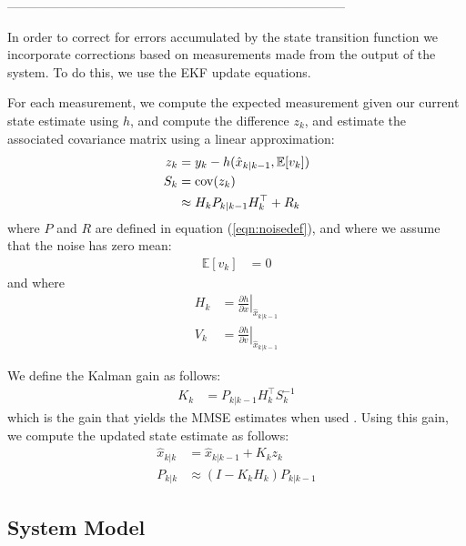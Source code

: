 \documentclass[]{article}
\begin{document}
{--------------------------------------------------------------------------------

In order to correct for errors accumulated by the state transition function we incorporate corrections based on measurements made from the output of the system. To do this, we use the EKF update equations.

For each measurement, we compute the expected measurement given our current state estimate using $h$, and compute the difference $z_k$, and estimate the associated covariance matrix using a linear approximation:
\begin{align}
	z_k &= y_k - h(\hat{x}_{k|k-1}, \mathbb{E}[v_k]) \\
	S_k &= \operatorname{cov}(z_k) \notag \\
		&\approx H_k P_{k|k-1} H_k^\top + R_k
\end{align}
where $P$ and $R$ are defined in equation (\ref{eqn:noisedef}), and where we assume that the noise has zero mean:
\begin{align}
	\mathbb{E}[v_k] &= 0
\end{align}
and where
\begin{align}
	H_{k} &= \left . \frac{\partial h}{\partial x} \right \vert _{\hat{x}_{k|k-1}} \\
	V_{k} &= \left . \frac{\partial h}{\partial v} \right \vert _{\hat{x}_{k|k-1}}
\end{align}

We define the Kalman gain as follows:
\begin{align}
	K_k &= P_{k|k-1} H_k^\top S_k^{-1}
\end{align}
which is the gain that yields the MMSE estimates when used \cite{BerkelyCourse}. Using this gain, we compute the updated state estimate as follows:
\begin{align}
	\hat{x}_{k|k} 	&= \hat{x}_{k|k-1} + K_k z_k \\
	P_{k|k} 		&\approx (I - K_k H_k) P_{k|k-1}
\end{align}

\clearpage

\subsection{System Model} %
\label{sub:system_model}

}
\end{document}
